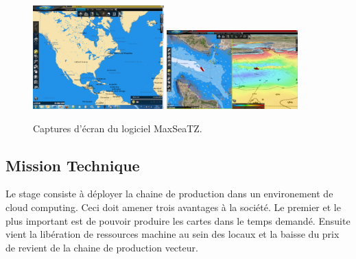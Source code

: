 \begin{figure}[h!]
  \caption{Captures d'écran du logiciel MaxSeaTZ.}
  \centering
    \includegraphics[width=0.45\textwidth]{images/MXTZ.png}
    \includegraphics[width=0.45\textwidth]{images/MaxSeaTZ.jpg}
\end{figure}


\subsection{Mission Technique}
Le stage consiste à déployer la chaine de production dans un
environement de cloud computing. Ceci doit amener trois avantages à la
société. Le premier et le plus important est de pouvoir produire les
cartes dans le temps demandé. Ensuite vient la libération de
ressources machine au sein des locaux et la baisse du prix de revient
de la chaine de production vecteur.






